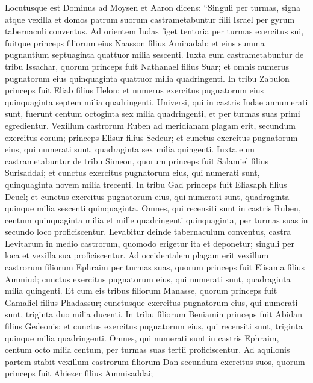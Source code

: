 \begin{biblechapter}  
\verse Locutusque est Dominus ad Moysen et Aaron dicens: 
\verse “Singuli per turmas, signa atque vexilla et domos patrum suorum castrametabuntur filii Israel per gyrum tabernaculi conventus. 
\verse Ad orientem Iudas figet tentoria per turmas exercitus sui, fuitque princeps filiorum eius Naasson filius Aminadab; 
\verse et eius summa pugnantium septuaginta quattuor milia sescenti. 
\verse Iuxta eum castrametabuntur de tribu Issachar, quorum princeps fuit Nathanael filius Suar; 
\verse et omnis numerus pugnatorum eius quinquaginta quattuor milia quadringenti. 
\verse In tribu Zabulon princeps fuit Eliab filius Helon; 
\verse et numerus exercitus pugnatorum eius quinquaginta septem milia quadringenti. 
\verse Universi, qui in castris Iudae annumerati sunt, fuerunt centum octoginta sex milia quadringenti, et per turmas suas primi egredientur. 
\verse Vexillum castrorum Ruben ad meridianam plagam erit, secundum exercitus eorum; princeps Elisur filius Sedeur; 
\verse et cunctus exercitus pugnatorum eius, qui numerati sunt, quadraginta sex milia quingenti. 
\verse Iuxta eum castrametabuntur de tribu Simeon, quorum princeps fuit Salamiel filius Surisaddai; 
\verse et cunctus exercitus pugnatorum eius, qui numerati sunt, quinquaginta novem milia trecenti. 
\verse In tribu Gad princeps fuit Eliasaph filius Deuel; 
\verse et cunctus exercitus pugnatorum eius, qui numerati sunt, quadraginta quinque milia sescenti quinquaginta. 
\verse Omnes, qui recensiti sunt in castris Ruben, centum quinquaginta milia et mille quadringenti quinquaginta, per turmas suas in secundo loco proficiscentur. 
\verse Levabitur deinde tabernaculum conventus, castra Levitarum in medio castrorum, quomodo erigetur ita et deponetur; singuli per loca et vexilla sua proficiscentur. 
\verse Ad occidentalem plagam erit vexillum castrorum filiorum Ephraim per turmas suas, quorum princeps fuit Elisama filius Ammiud; 
\verse cunctus exercitus pugnatorum eius, qui numerati sunt, quadraginta milia quingenti. 
\verse Et cum eis tribus filiorum Manasse, quorum princeps fuit Gamaliel filius Phadassur;  
\verse cunctusque exercitus pugnatorum eius, qui numerati sunt, triginta duo milia ducenti. 
\verse In tribu filiorum Beniamin princeps fuit Abidan filius Gedeonis;  
\verse et cunctus exercitus pugnatorum eius, qui recensiti sunt, triginta quinque milia quadringenti. 
\verse Omnes, qui numerati sunt in castris Ephraim, centum octo milia centum, per turmas suas tertii proficiscentur. 
\verse Ad aquilonis partem stabit vexillum castrorum filiorum Dan secundum exercitus suos, quorum princeps fuit Ahiezer filius Ammisaddai; 

\end{biblechapter}
